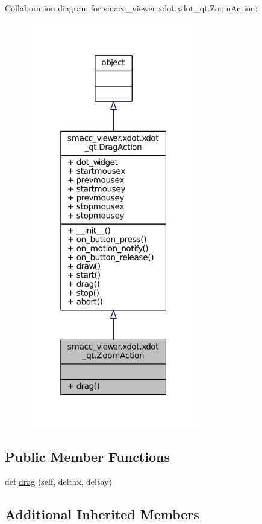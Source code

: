 Collaboration diagram for smacc\+\_\+viewer.\+xdot.\+xdot\+\_\+qt.\+Zoom\+Action\+:
\nopagebreak
\begin{figure}[H]
\begin{center}
\leavevmode
\includegraphics[width=211pt]{classsmacc__viewer_1_1xdot_1_1xdot__qt_1_1ZoomAction__coll__graph}
\end{center}
\end{figure}
\subsection*{Public Member Functions}
\begin{DoxyCompactItemize}
\item 
def \hyperlink{classsmacc__viewer_1_1xdot_1_1xdot__qt_1_1ZoomAction_aa4795866654dda16304a9cd1ac0c06e4}{drag} (self, deltax, deltay)
\end{DoxyCompactItemize}
\subsection*{Additional Inherited Members}


